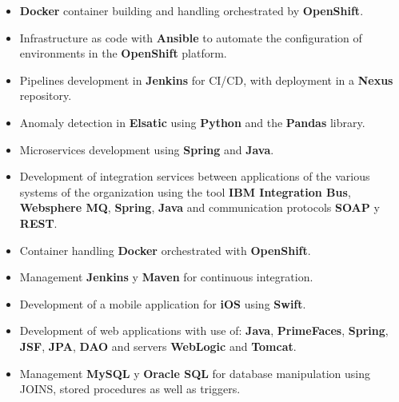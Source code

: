 \documentclass[letterpaper]{style} %
\begin{document}


\begin{itemize}
	\item \textbf{Docker} container building and handling orchestrated by \textbf{OpenShift}.
	\item Infrastructure as code with \textbf{Ansible} to automate the configuration of environments in the \textbf {OpenShift} platform.
	\item Pipelines development in \textbf{Jenkins} for CI/CD, with deployment in a \textbf{Nexus} repository.
	\item Anomaly detection in \textbf{Elsatic} using \textbf{Python} and the \textbf{Pandas} library.
	\item Microservices development using \textbf{Spring} and \textbf{Java}.
\end{itemize}

\divider

\begin{itemize}
	\item Development of integration services between applications of the various systems of the organization using the tool \textbf{IBM Integration Bus}, \textbf{Websphere MQ}, \textbf{Spring}, \textbf{Java} and communication protocols \textbf{SOAP} y \textbf{REST}.
	\item Container handling \textbf{Docker} orchestrated with \textbf{OpenShift}.
	\item Management \textbf {Jenkins} y \textbf{Maven} for continuous integration.
\end{itemize}


\newpage %

\makeprofileSecond %

\begin{itemize}
	\item Development of a mobile application for \textbf{iOS} using \textbf{Swift}.
	\item Development of web applications with use of: \textbf{Java}, \textbf{PrimeFaces}, \textbf{Spring}, \textbf{JSF}, \textbf{JPA}, \textbf{DAO}  and servers \textbf{WebLogic} and \textbf{Tomcat}.
	\item Management \textbf{MySQL} y \textbf{Oracle SQL} for database manipulation using JOINS, stored procedures as well as triggers.
\end{itemize}
\end{document}

